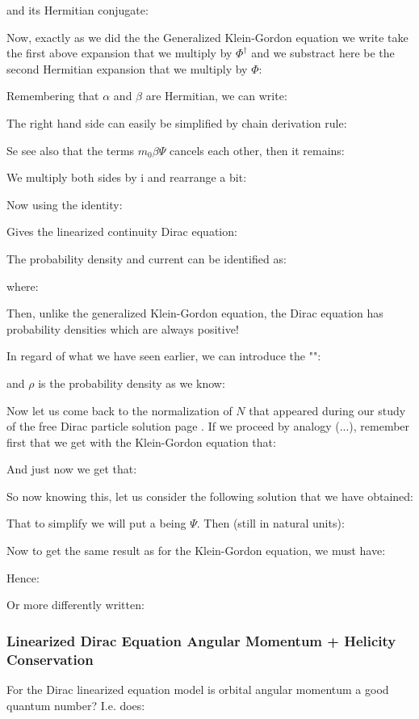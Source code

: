 	and its Hermitian conjugate:
	
	Now, exactly as we did the the Generalized Klein-Gordon equation we write take the first above expansion that we multiply by $\Phi^\dagger$ and we substract here be the second Hermitian expansion that we multiply by $\Phi$:
	
	Remembering that $\alpha$ and $\beta$ are Hermitian, we can write:
	
	The right hand side can easily be simplified by chain derivation rule:
	
	Se see also that the terms $m_0\beta\Psi$ cancels each other, then it remains:
	
	We multiply both sides by $\mathrm{i}$ and rearrange a bit:
	
	Now using the identity:
	
	Gives the linearized continuity Dirac equation:
	
	The probability density and current  can be identified as:
	
	where:
	
	Then, unlike the generalized Klein-Gordon equation, the Dirac equation has probability densities which are always positive!
	
	In regard of what we have seen earlier, we can introduce the "":
	
	and $\rho$ is the probability density as we know:
	
	
	\label{normalization dirac free particle solution}Now let us come back to the normalization of $N$ that appeared during our study of the free Dirac particle solution page \pageref{free particle dirac equation involving factor N}. If we proceed by analogy (...), remember first that we get with the Klein-Gordon equation that:
	
	And just now we get that:
	
	So now knowing this, let us consider the following solution that we have obtained:
	
	That to simplify we will put a being $\Psi$. Then (still in natural units):
	
	Now to get the same result as for the Klein-Gordon equation, we must have:
	
	Hence:
	
	Or more differently written:
	
	
	\subsubsection{Linearized Dirac Equation Angular Momentum + Helicity Conservation}
	For the Dirac linearized equation model is orbital angular momentum a good quantum number? I.e. does:
	
